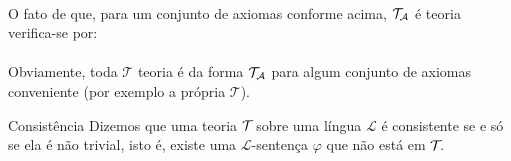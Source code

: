         \paragraph{}
            O fato de que, para um conjunto de axiomas conforme acima, $\theoryof{\mathcal{A}}$ é teoria 
            verifica-se por:
        \begin{proof*}
            \begin{prooftree}


                

            \end{prooftree}
            \eop
        \end{proof*}
        \paragraph{}
            Obviamente, toda $\mathcal{T}$ teoria é da forma $\theoryof{\mathcal{A}}$ para algum 
            conjunto de axiomas conveniente (por exemplo a própria $\mathcal{T}$).

        \begin{definition}{Consistência}
            Dizemos que uma teoria $\theoryof{}$ sobre uma língua $\mathcal{L}$ é 
            consistente se e só se ela é não trivial, isto é, existe uma 
            $\mathcal{L}$-sentença $\varphi$ que não está em $\theoryof{}$.
        \end{definition}
        
